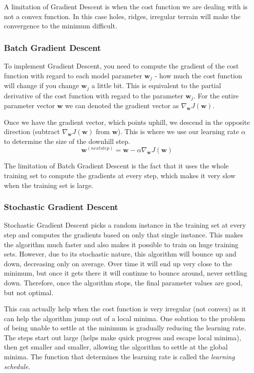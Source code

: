 \documentclass[12pt]{article}
\begin{document}
        A limitation of Gradient Descent is when the cost function we are dealing with is not a convex function. In this case holes, ridges, irregular terrain will make the convergence to the minimum difficult.

        \subsubsection{Batch Gradient Descent}
            To implement Gradient Descent, you need to compute the gradient of the cost function with regard to each model parameter $\boldsymbol{w}_j$ - how much the cost function will change if you change $\boldsymbol{w}_j$
            a little bit. This is equivalent to the partial derivative of the cost function with regard to the parameter $\boldsymbol{w}_j$. For the entire parameter vector $\boldsymbol{w}$ we can denoted the gradient vector as
            $\nabla_{\boldsymbol{w}} J(\boldsymbol{w})$.

            Once we have the gradient vector, which points uphill, we descend in the opposite direction (subtract $\nabla_{\boldsymbol{w}} J(\boldsymbol{w})$ from $\boldsymbol{w}$). This is where we use our learning rate $\alpha$ to determine the size of the
            downhill step.
            $$ \boldsymbol{w}^{(next step)} = \boldsymbol{w} - \alpha \nabla_{\boldsymbol{w}} J(\boldsymbol{w}) $$

            The limitation of Batch Gradient Descent is the fact that it uses the whole training set to compute the gradients at every step, which makes it very slow when the training set is large.
        
        \subsubsection{Stochastic Gradient Descent}
            Stochastic Gradient Descent picks a random instance in the training set at every step and computes the gradients based on only that single instance. This makes the algorithm much faster and also makes it possible to train on huge training sets.
            However, due to its stochastic nature, this algorithm will bounce up and down, decreasing only on average. Over time it will end up very close to the minimum, but once it gets there it will continue to bounce around, never settling down.
            Therefore, once the algorithm stops, the final parameter values are good, but not optimal.

            This can actually help when the cost function is very irregular (not convex) as it can help the algorithm jump out of a local minima. One solution to the problem of being unable to settle at the minimum 
            is gradually reducing the learning rate. The steps start out large (helps make quick progress and escape local minima), then get smaller and smaller, allowing the algorithm to settle at the global minima.
            The function that determines the learning rate is called the \textit{learning schedule}.
        
\end{document}
